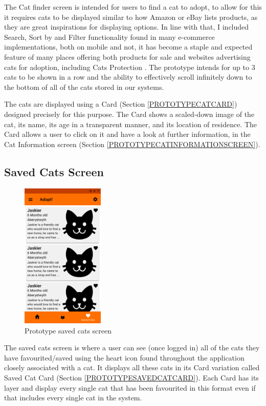 The Cat finder screen is intended for users to find a cat to adopt, to allow for this it requires cats to be displayed similar to how Amazon or eBay lists products, as they are great inspirations for displaying options. In line with that, I included Search, Sort by and Filter functionality found in many e-commerce implementations, both on mobile and not, it has become a staple and expected feature of many places offering both products for sale and websites advertising cats for adoption, including Cats Protection \cite{CATSPROTECTION}. The prototype intends for up to 3 cats to be shown in a row and the ability to effectively scroll infinitely down to the bottom of all of the cats stored in our systems.

The cats are displayed using a \gls{Card} (Section \ref{PROTOTYPECATCARD}) designed precisely for this purpose. The \gls{Card} shows a scaled-down image of the cat, its name, its age in a transparent manner, and its location of residence. The \gls{Card} allows a user to click on it and have a look at further information, in the Cat Information screen (Section \ref{PROTOTYPECATINFORMATIONSCREEN}). 

\subsection{Saved Cats Screen}

\begin{figure} [htbp!]
    \centering
    \includegraphics[height=7cm]{Images/PrototypeSavedCats.png}
    \caption{Prototype saved cats screen}
    \label{fig:prototype_saved_cats}
\end{figure}

The saved cats screen is where a user can see (once logged in) all of the cats they have favourited/saved using the heart icon found throughout the application closely associated with a cat. It displays all these cats in its \gls{Card} variation called Saved Cat Card (Section \ref{PROTOTYPESAVEDCATCARD}). Each \gls{Card} has its layer and display every single cat that has been favourited in this format even if that includes every single cat in the system.


